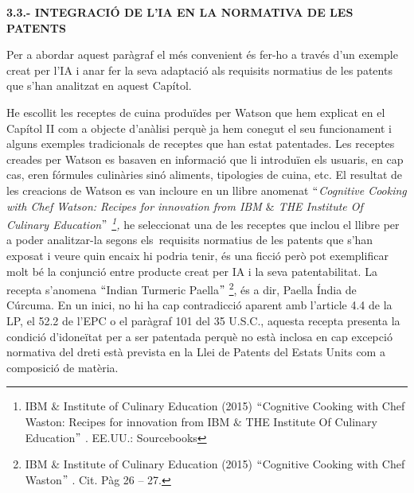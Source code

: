 \documentclass[12pt]{article}
\renewcommand{\_}{\kern-1.5pt\textunderscore\kern-1.5pt}
\begin{document}
\begin{itemize}
\vspace{\baselineskip}
\begin{justify}
\textbf{3.3.- INTEGRACIÓ DE L’IA EN LA NORMATIVA DE LES PATENTS}
\end{justify}\par


\vspace{\baselineskip}
\begin{justify}
Per a abordar aquest paràgraf el més convenient és fer-ho a través d’un exemple creat per l’IA i anar fer la seva adaptació als requisits normatius de les patents que s’han analitzat en aquest Capítol. 
\end{justify}\par


\vspace{\baselineskip}
\begin{justify}
He escollit les receptes de cuina produïdes per Watson que hem explicat en el Capítol II com a objecte d’anàlisi perquè ja hem conegut el seu funcionament i alguns exemples tradicionals de receptes que han estat patentades.  Les receptes creades per Watson es basaven en informació que li introduïen els usuaris, en cap cas, eren fórmules culinàries sinó aliments, tipologies de cuina, etc. El resultat de les creacions de Watson es van incloure en un llibre anomenat \textit{$``$Cognitive Cooking with Chef Watson: Recipes for innovation from IBM $\&$  THE Institute Of Culinary Education$"$ \footnote{ IBM $\&$  Institute of Culinary Education (2015) $``$Cognitive Cooking with Chef Waston: Recipes for innovation from IBM $\&$  THE Institute Of Culinary Education$"$ . EE.UU.: Sourcebooks }, }he seleccionat una de les receptes que inclou el llibre per a poder analitzar-la segons els\ requisits normatius  de les patents que s’han exposat i veure quin encaix hi podria tenir, és una ficció però pot exemplificar molt bé la conjunció entre producte creat per IA i la seva patentabilitat. La recepta s’anomena $``$Indian Turmeric Paella$"$ \footnote{ IBM $\&$  Institute of Culinary Education (2015) $``$Cognitive Cooking with Chef Waston$"$  . Cit. Pàg 26 – 27. }, és a dir, Paella Índia de Cúrcuma. En un inici, no hi ha cap contradicció aparent amb l’article 4.4 de la LP, el 52.2 de l’EPC o el paràgraf 101 del 35 U.S.C., aquesta recepta presenta la condició d’idoneïtat per a ser patentada perquè no està inclosa en cap excepció normativa del dreti està prevista en la Llei de Patents del Estats Units com a composició de matèria. 
\end{justify}\par



\end{itemize}
\end{document}
